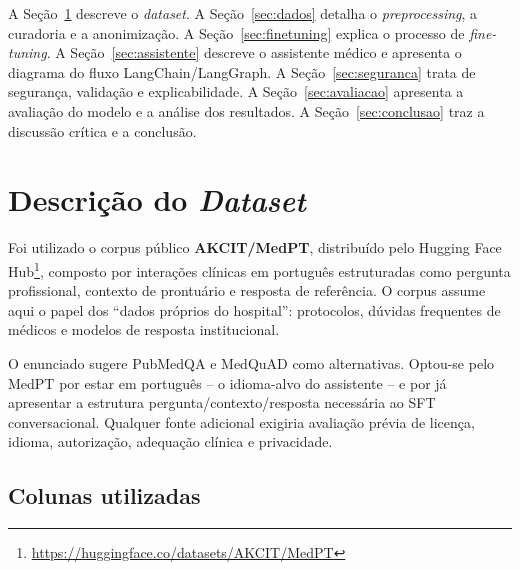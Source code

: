 \documentclass[12pt,a4paper]{article}
\begin{document}
A Seção~\ref{sec:dataset} descreve o \emph{dataset}. A Seção~\ref{sec:dados}
detalha o \emph{preprocessing}, a curadoria e a anonimização. A
Seção~\ref{sec:finetuning} explica o processo de \emph{fine-tuning}. A
Seção~\ref{sec:assistente} descreve o assistente médico e apresenta o diagrama do
fluxo LangChain/LangGraph. A Seção~\ref{sec:seguranca} trata de segurança,
validação e explicabilidade. A Seção~\ref{sec:avaliacao} apresenta a avaliação do
modelo e a análise dos resultados. A Seção~\ref{sec:conclusao} traz a discussão
crítica e a conclusão.

\section{Descrição do \emph{Dataset}}
\label{sec:dataset}

Foi utilizado o corpus público \textbf{AKCIT/MedPT}, distribuído pelo Hugging
Face Hub\footnote{\url{https://huggingface.co/datasets/AKCIT/MedPT}}, composto por
interações clínicas em português estruturadas como pergunta profissional,
contexto de prontuário e resposta de referência. O corpus assume aqui o papel dos
``dados próprios do hospital'': protocolos, dúvidas frequentes de médicos e
modelos de resposta institucional.

O enunciado sugere PubMedQA e MedQuAD como alternativas. Optou-se pelo MedPT por
estar em português -- o idioma-alvo do assistente -- e por já apresentar a
estrutura pergunta/contexto/resposta necessária ao SFT conversacional. Qualquer
fonte adicional exigiria avaliação prévia de licença, idioma, autorização,
adequação clínica e privacidade.

\subsection{Colunas utilizadas}
\end{document}
